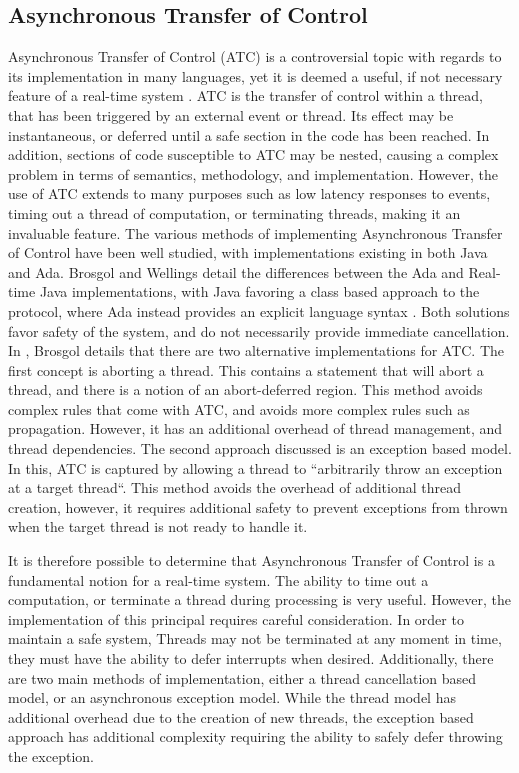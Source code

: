 \subsection{Asynchronous Transfer of Control}
Asynchronous Transfer of Control (ATC) is a controversial topic with regards to its 
implementation in many languages, yet it is deemed a useful, if not necessary 
feature of a real-time system \cite{atc-article}. 
ATC is the transfer 
of control within a thread, that has been triggered by an external event or thread. 
Its effect may be instantaneous, or deferred until a safe section in the code has 
been reached. In addition, sections of code susceptible to ATC may be nested, causing a 
complex problem in terms of semantics, methodology, and implementation. 
However, the use of ATC extends to many purposes such as low latency responses to events, timing 
out a thread of computation, or terminating threads, making it an invaluable feature. 
The various methods of implementing Asynchronous Transfer of Control have been well 
studied, with implementations existing in both Java and Ada. Brosgol and Wellings 
detail the differences between the Ada and Real-time Java implementations, with 
Java favoring a class based approach to the protocol, where Ada instead provides 
an explicit language syntax \cite{atc-article}. Both solutions favor safety of 
the system, and do not necessarily provide immediate cancellation. In \cite{Brosgol:2002:ATC}, 
Brosgol details that there are two alternative implementations for ATC. The first 
concept is aborting a thread. This contains a statement that will abort a thread, 
and there is a notion of an abort-deferred region. This method avoids complex rules 
that come with ATC, and avoids more complex rules such as propagation. However, 
it has an additional overhead of thread management, and thread dependencies. 
The second approach discussed is an exception based model. In this, ATC is 
captured by allowing a thread to ``arbitrarily throw an exception at a target thread``.
This method avoids the overhead of additional thread creation, however, it requires 
additional safety to prevent exceptions from thrown when the target thread is not 
ready to handle it. 
\par\bigskip\noindent
It is therefore possible to determine that Asynchronous Transfer of Control is a 
fundamental notion for a real-time system. The ability to time out a computation, 
or terminate a thread during processing is very useful. However, the implementation 
of this principal requires careful consideration. In order to maintain a safe 
system, Threads may not be terminated at any moment in time, they must have the 
ability to defer interrupts when desired. Additionally, there are two main methods 
of implementation, either a thread cancellation based model, or an asynchronous 
exception model. While the thread model has additional overhead due to the creation 
of new threads, the exception based approach has additional complexity requiring 
the ability to safely defer throwing the exception. 

